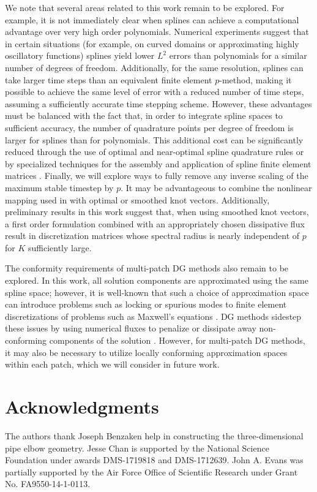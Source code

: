 \documentclass[preprint,10pt]{elsarticle}
\newcommand{\reviewerTwo}[1]{#1}
\begin{document}
We note that several areas related to this work remain to be explored.  For example, it is not immediately clear when splines can achieve a computational advantage over very high order polynomials.  Numerical experiments suggest that in certain situations (for example, on curved domains or approximating highly oscillatory functions) splines yield lower $L^2$ errors than polynomials for a similar number of degrees of freedom.  Additionally, for the same resolution, splines can take larger time steps than an equivalent finite element $p$-method, making it possible to achieve the same level of error with a reduced number of time steps, assuming a sufficiently accurate time stepping scheme.  However, these advantages must be balanced with the fact that, in order to integrate spline spaces \reviewerTwo{to} sufficient accuracy, the number of quadrature points per degree of freedom is larger for splines than for polynomials.  This additional cost can be significantly reduced through the use of optimal and near-optimal spline quadrature rules \cite{hughes2010efficient, auricchio2012simple} or by specialized techniques for the assembly and application of spline finite element matrices \cite{calabro2016fast}.  Finally, we will explore ways to fully remove any inverse scaling of the maximum stable timestep by $p$.  It may be advantageous to combine the nonlinear mapping used in \cite{hughes2008duality} with optimal or smoothed knot vectors.  Additionally, preliminary results in this work suggest that, when using smoothed knot vectors, a first order formulation combined with an appropriately chosen dissipative flux result in discretization matrices whose spectral radius is nearly independent of $p$ for $K$ sufficiently large.   

The conformity requirements of multi-patch DG methods also remain to be explored.  In this work, all solution components are approximated using the same spline space; however, it is well-known that such a choice of approximation space can introduce problems such as locking or spurious modes to finite element discretizations of problems such as Maxwell's equations \cite{buffa2010isogeometric, ratnani2012arbitrary}.  DG methods sidestep these issues by using numerical fluxes to penalize or dissipate away non-conforming components of the solution \cite{Warburton20063205, chan2016short}.  However, for multi-patch DG methods, it may also be necessary to utilize locally conforming approximation spaces within each patch, which we will consider in future work.  


\section{Acknowledgments}

The authors thank Joseph Benzaken help in constructing the three-dimensional pipe elbow geometry.  Jesse Chan is supported by the National Science Foundation under awards DMS-1719818 and DMS-1712639.  John A. Evans was partially supported by the Air Force Office of Scientific Research under Grant No. FA9550-14-1-0113.  



\end{document}
